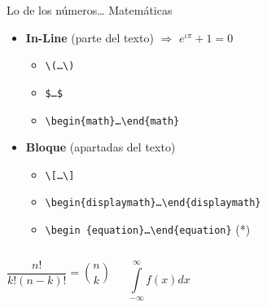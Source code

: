 \begin{frame}{Lo de los números\ldots{} Matemáticas}
    
    \pause
    
    \begin{itemize}
        \item \textbf{In-Line} (parte del texto) $\Rightarrow$ $e^{\iota\pi}+1=0$
        \begin{itemize}
           \item \texttt{\textbackslash (\ldots{}\textbackslash )}
           \item \texttt{\$\ldots{}\$} 
           \item \texttt{\textbackslash begin\{math\}\ldots{}\textbackslash end\{math\}}
        \end{itemize}
    \vspace{0.5cm}
        \pause
        \item \textbf{Bloque} (apartadas del texto)
        \begin{itemize}
            \item \texttt{\textbackslash [\ldots{}\textbackslash]}
            \item \texttt{\textbackslash begin\{displaymath\}\ldots{}\textbackslash end\{displaymath\}}
            \item \texttt{\textbackslash begin \{equation\}\ldots{}\textbackslash end\{equation\}} (*)
        \end{itemize}
    \end{itemize}
    
    \vspace{0.5cm}

    \begin{columns}
            \begin{equation}
                \frac{n!}{k!(n-k)!} = \binom{n}{k}
            \end{equation}
    
            \begin{equation*}
                \int\limits_{-\infty}^{\infty}f(x)dx
            \end{equation*}
    \end{columns}
    

\end{frame}